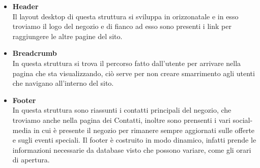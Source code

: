 	\begin{itemize}
		\item \textbf{Header}\\Il layout desktop di questa struttura si sviluppa in orizzonatale e in esso troviamo il logo del negozio e di fianco ad esso sono presenti i link per raggiungere le altre pagine del sito.
		\item \textbf{Breadcrumb}\\In questa struttura si trova il percorso fatto dall'utente per arrivare nella pagina che sta visualizzando, ciò serve per non creare smarrimento agli utenti che navigano all'interno del sito.
		\item \textbf{Footer}\\In questa struttura sono riassunti i contatti principali del negozio, che troviamo anche nella pagina dei Contatti, inoltre sono prensenti i vari social-media in cui è presente il negozio per rimanere sempre aggiornati sulle offerte e sugli eventi speciali. Il footer è costruito in modo dinamico, infatti prende le informazioni necessarie da database visto che possono variare, come gli orari di apertura.
 	\end{itemize}
 		
